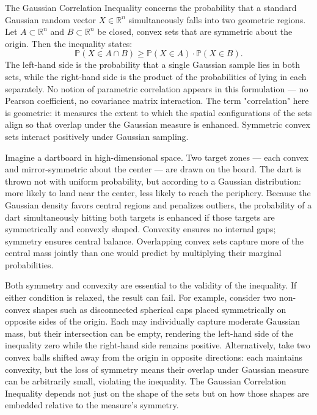 The Gaussian Correlation Inequality concerns the probability that a standard Gaussian random vector \( X \in \mathbb{R}^n \) simultaneously falls into two geometric regions. Let \( A \subset \mathbb{R}^n \) and \( B \subset \mathbb{R}^n \) be closed, convex sets that are symmetric about the origin. Then the inequality states:
\[
\mathbb{P}(X \in A \cap B) \geq \mathbb{P}(X \in A) \cdot \mathbb{P}(X \in B).
\]
The left-hand side is the probability that a single Gaussian sample lies in both sets, while the right-hand side is the product of the probabilities of lying in each separately. No notion of parametric correlation appears in this formulation — no Pearson coefficient, no covariance matrix interaction. The term "correlation" here is geometric: it measures the extent to which the spatial configurations of the sets align so that overlap under the Gaussian measure is enhanced. Symmetric convex sets interact positively under Gaussian sampling.

Imagine a dartboard in high-dimensional space. Two target zones — each convex and mirror-symmetric about the center — are drawn on the board. The dart is thrown not with uniform probability, but according to a Gaussian distribution: more likely to land near the center, less likely to reach the periphery. Because the Gaussian density favors central regions and penalizes outliers, the probability of a dart simultaneously hitting both targets is enhanced if those targets are symmetrically and convexly shaped. Convexity ensures no internal gaps; symmetry ensures central balance. Overlapping convex sets capture more of the central mass jointly than one would predict by multiplying their marginal probabilities.

Both symmetry and convexity are essential to the validity of the inequality. If either condition is relaxed, the result can fail. For example, consider two non-convex shapes such as disconnected spherical caps placed symmetrically on opposite sides of the origin. Each may individually capture moderate Gaussian mass, but their intersection can be empty, rendering the left-hand side of the inequality zero while the right-hand side remains positive. Alternatively, take two convex balls shifted away from the origin in opposite directions: each maintains convexity, but the loss of symmetry means their overlap under Gaussian measure can be arbitrarily small, violating the inequality. The Gaussian Correlation Inequality depends not just on the shape of the sets but on how those shapes are embedded relative to the measure's symmetry.

